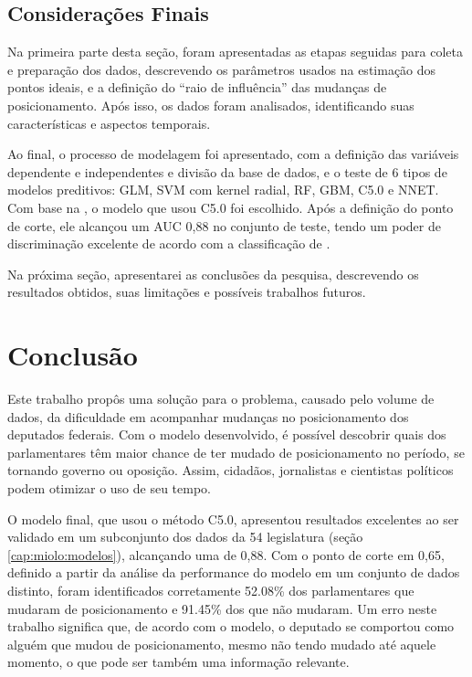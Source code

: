 \documentclass[a4paper,titlepage]{ppgi}\usepackage[]{graphicx}\usepackage[]{color}
\begin{document}
\section{Considerações Finais}

Na primeira parte desta seção, foram apresentadas as etapas seguidas para
coleta e preparação dos dados, descrevendo os parâmetros usados na estimação
dos pontos ideais, e a definição do ``raio de influência'' das mudanças de
posicionamento. Após isso, os dados foram analisados, identificando suas
características e aspectos temporais.

Ao final, o processo de modelagem foi apresentado, com a definição das
variáveis dependente e independentes e divisão da base de dados, e o teste de 6
tipos de modelos preditivos: \gls{GLM}, SVM com kernel radial, \gls{RF},
\gls{GBM}, C5.0 e \gls{NNET}. Com base na , o modelo que usou
C5.0 foi escolhido. Após a definição do ponto de corte, ele alcançou um
\gls{AUC} 0,88 no conjunto de teste, tendo um
poder de discriminação excelente de acordo com a classificação de
.

Na próxima seção, apresentarei as conclusões da pesquisa, descrevendo os
resultados obtidos, suas limitações e possíveis trabalhos futuros.

\chapter{Conclusão}\label{cap:conclusao}

Este trabalho propôs uma solução para o problema, causado pelo volume de dados,
da dificuldade em acompanhar mudanças no posicionamento dos deputados federais.
Com o modelo desenvolvido, é possível descobrir quais dos parlamentares têm
maior chance de ter mudado de posicionamento no período, se tornando governo ou
oposição. Assim, cidadãos, jornalistas e cientistas políticos podem otimizar o
uso de seu tempo.

O modelo final, que usou o método C5.0, apresentou resultados excelentes ao ser
validado em um subconjunto dos dados da 54\textordfeminine{} legislatura (seção
\ref{cap:miolo:modelos}), alcançando uma  de
0,88. Com o ponto de corte em
0,65, definido a partir da análise da performance do modelo em
um conjunto de dados distinto, foram identificados corretamente
52.08\% dos parlamentares
que mudaram de posicionamento e
91.45\% dos que não
mudaram. Um erro neste trabalho significa que, de acordo com o modelo, o deputado
se comportou como alguém que mudou de posicionamento, mesmo não tendo mudado
até aquele momento, o que pode ser também uma informação relevante.
\end{document}
